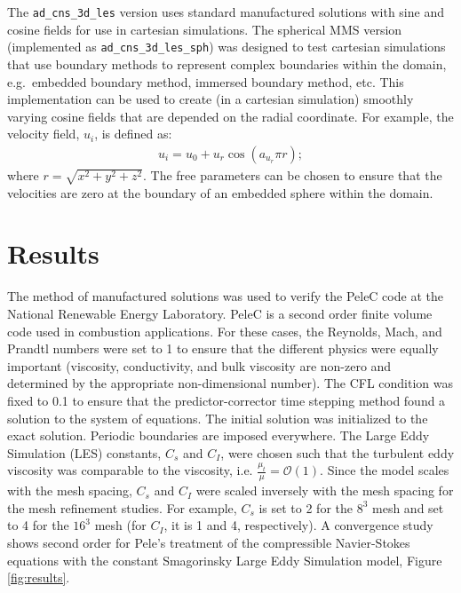 \documentclass[10pt]{article}
\begin{document}
The \texttt{ad\_cns\_3d\_les} version uses standard manufactured
solutions with sine and cosine fields for use in cartesian
simulations. The spherical MMS version (implemented as
\texttt{ad\_cns\_3d\_les\_sph}) was designed to test cartesian
simulations that use boundary methods to represent complex boundaries
within the domain, e.g.\ embedded boundary method, immersed boundary
method, etc. This implementation can be used to create (in a cartesian
simulation) smoothly varying cosine fields that are depended on the
radial coordinate. For example, the velocity field, $u_i$, is defined
as:
\begin{align}
u_i = u_0 + u_r \cos(a_{u_r} \pi r);
\end{align}
where $r = \sqrt{x^2 + y^2+z^2}$. The free parameters can be chosen to
ensure that the velocities are zero at the boundary of an embedded
sphere within the domain.

\section{Results}

The method of manufactured solutions was used to verify the PeleC code
at the National Renewable Energy Laboratory. PeleC is a second order
finite volume code used in combustion applications. For these cases,
the Reynolds, Mach, and Prandtl numbers were set to 1 to ensure that
the different physics were equally important (viscosity, conductivity,
and bulk viscosity are non-zero and determined by the appropriate
non-dimensional number). The CFL condition was fixed to 0.1 to ensure
that the predictor-corrector time stepping method found a solution to
the system of equations. The initial solution was initialized to the
exact solution. Periodic boundaries are imposed everywhere. The Large
Eddy Simulation (LES) constants, $C_s$ and $C_I$, were chosen such
that the turbulent eddy viscosity was comparable to the viscosity,
i.e. $\frac{\mu_t}{\mu} = \mathcal{O}(1)$. Since the model scales with
the mesh spacing, $C_s$ and $C_I$ were scaled inversely with the mesh
spacing for the mesh refinement studies. For example, $C_s$ is set to
2 for the $8^3$ mesh and set to 4 for the $16^3$ mesh (for $C_I$, it
is 1 and 4, respectively). A convergence study shows second order for
Pele's treatment of the compressible Navier-Stokes equations with the
constant Smagorinsky Large Eddy Simulation model,
Figure\,\ref{fig:results}.
\end{document}
